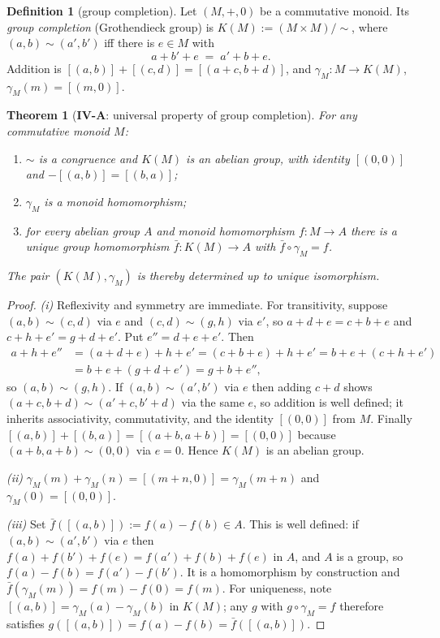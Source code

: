 \documentclass[12pt]{article}
\newcommand{\Groth}{K}                       %
\newtheorem{theorem}{Theorem}[section]
\theoremstyle{definition}
\newtheorem{definition}[definition]{Definition}
\theoremstyle{remark}
\theoremstyle{plain}
\begin{document}
\begin{definition}[group completion]
\label{def:groth}
Let $(M,+,0)$ be a commutative monoid. Its \emph{group completion} (Grothendieck
group) is $\Groth(M):=(M\times M)/{\sim}$, where $(a,b)\sim(a',b')$ iff there is
$e\in M$ with
\[
  a+b'+e \;=\; a'+b+e .
\]
Addition is $[(a,b)]+[(c,d)]=[(a+c,b+d)]$, and
$\gamma_M:M\to\Groth(M)$, $\gamma_M(m)=[(m,0)]$.
\end{definition}

\begin{theorem}[\textbf{IV-A}: universal property of group completion]
\label{thm:groth}
For any commutative monoid $M$:
\begin{enumerate}
\item[(i)] $\sim$ is a congruence and $\Groth(M)$ is an abelian group, with
  identity $[(0,0)]$ and $-[(a,b)]=[(b,a)]$;
\item[(ii)] $\gamma_M$ is a monoid homomorphism;
\item[(iii)] for every abelian group $A$ and monoid homomorphism $f:M\to A$
  there is a unique group homomorphism $\bar f:\Groth(M)\to A$ with
  $\bar f\circ\gamma_M=f$.
\end{enumerate}
The pair $(\Groth(M),\gamma_M)$ is thereby determined up to unique isomorphism.
\end{theorem}

\begin{proof}
\emph{(i)} Reflexivity and symmetry are immediate. For transitivity, suppose
$(a,b)\sim(c,d)$ via $e$ and $(c,d)\sim(g,h)$ via $e'$, so
$a+d+e=c+b+e$ and $c+h+e'=g+d+e'$. Put $e''=d+e+e'$. Then
\begin{align*}
a+h+e'' &= (a+d+e)+h+e' = (c+b+e)+h+e' = b+e+(c+h+e')\\
        &= b+e+(g+d+e') = g+b+e'',
\end{align*}
so $(a,b)\sim(g,h)$. If $(a,b)\sim(a',b')$ via $e$ then adding $c+d$ shows
$(a+c,b+d)\sim(a'+c,b'+d)$ via the same $e$, so addition is well defined; it
inherits associativity, commutativity, and the identity $[(0,0)]$ from $M$.
Finally $[(a,b)]+[(b,a)]=[(a+b,a+b)]=[(0,0)]$ because $(a+b,a+b)\sim(0,0)$ via
$e=0$. Hence $\Groth(M)$ is an abelian group.

\emph{(ii)} $\gamma_M(m)+\gamma_M(n)=[(m+n,0)]=\gamma_M(m+n)$ and
$\gamma_M(0)=[(0,0)]$.

\emph{(iii)} Set $\bar f([(a,b)]):=f(a)-f(b)\in A$. This is well defined: if
$(a,b)\sim(a',b')$ via $e$ then $f(a)+f(b')+f(e)=f(a')+f(b)+f(e)$ in $A$, and $A$
is a group, so $f(a)-f(b)=f(a')-f(b')$. It is a homomorphism by construction and
$\bar f(\gamma_M(m))=f(m)-f(0)=f(m)$. For uniqueness, note
$[(a,b)]=\gamma_M(a)-\gamma_M(b)$ in $\Groth(M)$; any $g$ with
$g\circ\gamma_M=f$ therefore satisfies
$g([(a,b)])=f(a)-f(b)=\bar f([(a,b)])$.
\end{proof}
\end{document}

